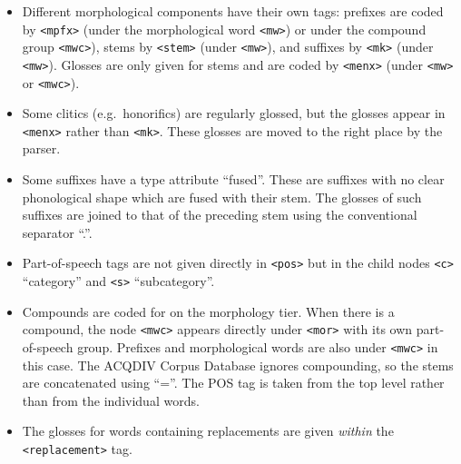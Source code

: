 \documentclass[a4paper, 11pt]{book}
\begin{document}
\begin{itemize}
	\item Different morphological components have their own tags: prefixes are coded by \texttt{<mpfx>} (under the morphological word \texttt{<mw>}) or
		under the compound group \texttt{<mwc>}), stems by \texttt{<stem>} (under \texttt{<mw>}), and suffixes by \texttt{<mk>} (under \texttt{<mw>}). 
		Glosses are only given for stems and are coded by \texttt{<menx>} (under \texttt{<mw>} or \texttt{<mwc>}). 
	\item Some clitics (e.g.\ honorifics) are regularly glossed, but the glosses appear in \texttt{<menx>} rather than \texttt{<mk>}. These glosses
		are moved to the right place by the parser. 
	\item Some suffixes have a type attribute “fused”. These are suffixes with no clear phonological shape which are fused with their stem. 
		The glosses of such suffixes are joined to that of the preceding stem using the conventional separator “.”. 
	\item Part-of-speech tags are not given directly in \texttt{<pos>} but in the child nodes \texttt{<c>} “category” and \texttt{<s>} “subcategory”.
	\item Compounds are coded for on the morphology tier. When there is a compound, the node \texttt{<mwc>} appears directly under \texttt{<mor>}
		with its own part-of-speech group. Prefixes and morphological words are also under \texttt{<mwc>} in this case. 
		The ACQDIV Corpus Database ignores compounding, so the stems are concatenated using “=”. The POS tag is taken from the top level rather than from the 
		individual words. 
	\item The glosses for words containing replacements are given \emph{within} the \texttt{<replacement>} tag. 
\end{itemize}

%
%
%
\end{document}
